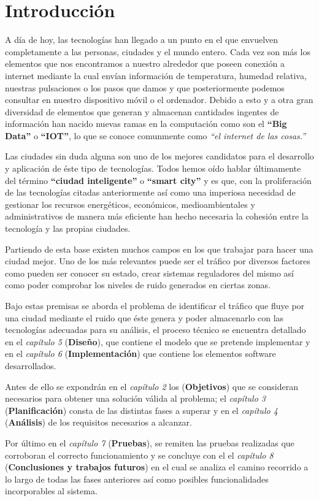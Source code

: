 \chapter{Introducción}

A día de hoy, las tecnologías han llegado a un punto en el que envuelven completamente a las personas, ciudades y el mundo entero. Cada vez son más los elementos que nos encontramos a nuestro alrededor que poseen conexión a internet mediante la cual envían información de temperatura, humedad relativa, nuestras pulsaciones o los pasos que damos y que posteriormente podemos consultar en nuestro dispositivo móvil o el ordenador. Debido a esto y a otra gran diversidad de elementos que generan y almacenan cantidades ingentes de información han nacido nuevas ramas en la computación como son el \textbf{``Big Data''} o \textbf{``IOT''}, lo que se conoce comunmente como \textit{``el internet de las cosas.''}

\bigskip
Las ciudades sin duda alguna son uno de los mejores candidatos para el desarrollo y aplicación de éste tipo de tecnologías. Todos hemos oído hablar últimamente del término \textbf{``ciudad inteligente''} o \textbf{``smart city''} y es que, con la proliferación de las tecnologías citadas anteriormente así como una imperiosa necesidad de gestionar los recursos energéticos, económicos, medioambientales y administrativos de manera más eficiente han hecho necesaria la cohesión entre la tecnología y las propias ciudades.

\bigskip
Partiendo de esta base existen muchos campos en los que trabajar para hacer una ciudad mejor. Uno de los más relevantes puede ser el tráfico por diversos factores como pueden ser conocer su estado, crear sistemas reguladores del mismo así como poder comprobar los niveles de ruido generados en ciertas zonas.

\bigskip
Bajo estas premisas se aborda el problema de identificar el tráfico que fluye por una ciudad mediante el ruido que éste genera y poder almacenarlo con las tecnologías adecuadas para su análisis, el proceso técnico se encuentra detallado en el \textit{capítulo 5} (\textbf{Diseño}), que contiene el modelo que se pretende implementar y en el \textit{capítulo 6} (\textbf{Implementación}) que contiene los elementos software desarrollados.

Antes de ello se expondrán en el \textit{capítulo 2}  los (\textbf{Objetivos}) que se consideran necesarios para obtener una solución válida al problema; el \textit{capítulo 3} (\textbf{Planificación}) consta de las distintas fases a superar y en el \textit{capítulo 4}  (\textbf{Análisis}) de los requisitos necesarios a alcanzar.

\bigskip
Por último en el \textit{capítulo 7} (\textbf{Pruebas}), se remiten las pruebas realizadas que corroboran el correcto funcionamiento y se concluye con el el \textit{capítulo 8} (\textbf{Conclusiones y trabajos futuros}) en el cual se analiza el camino recorrido a lo largo de todas las fases anteriores así como posibles funcionalidades incorporables al sistema.
